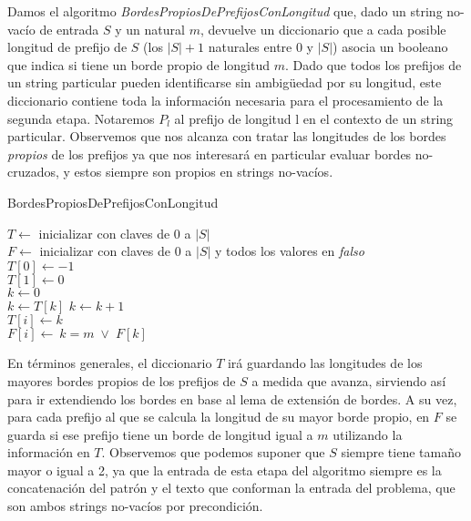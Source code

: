 Damos el algoritmo \textit{BordesPropiosDePrefijosConLongitud} que, dado un string no-vacío de entrada $S$ y un natural $m$, devuelve un diccionario que a cada posible longitud de prefijo de $S$ (los $|S|+1$ naturales entre 0 y $|S|$) asocia un booleano que indica si tiene un borde propio de longitud $m$. Dado que todos los prefijos de un string particular pueden identificarse sin ambigüedad por su longitud, este diccionario contiene toda la información necesaria para el procesamiento de la segunda etapa. Notaremos $P_l$ al prefijo de longitud l en el contexto de un string particular. Observemos que nos alcanza con tratar las longitudes de los bordes \textit{propios} de los prefijos ya que nos interesará en particular evaluar bordes no-cruzados, y estos siempre son propios en strings no-vacíos.

\bigskip

\begin{algorithm}[H]
	\caption{BordesPropiosDePrefijosConLongitud}

	$T \gets$ inicializar con claves de 0 a $|S|$ \\
	$F \gets$ inicializar con claves de 0 a $|S|$ y todos los valores en \textit{falso} \\
	$T [0] \gets -1$ \\
	$T [1] \gets 0$ \\
	$k \gets 0$ \\
	
     {
	 {
		$k \gets T[k]$
    	}
	$k \gets k+1$ \\
	$T[i] \gets k$ \\
	$F[i] \gets \: k = m \; \vee \; F[k]$
}

\end{algorithm}

\bigskip

En términos generales, el diccionario $T$ irá guardando las longitudes de los mayores bordes propios de los prefijos de $S$ a medida que avanza, sirviendo así para ir extendiendo los bordes en base al lema de extensión de bordes. A su vez, para cada prefijo al que se calcula la longitud de su mayor borde propio, en $F$ se guarda si ese prefijo tiene un borde de longitud igual a $m$ utilizando la información en $T$. Observemos que podemos suponer que $S$ siempre tiene tamaño mayor o igual a 2, ya que la entrada de esta etapa del algoritmo siempre es la concatenación del patrón y el texto que conforman la entrada del problema, que son ambos strings no-vacíos por precondición. 


